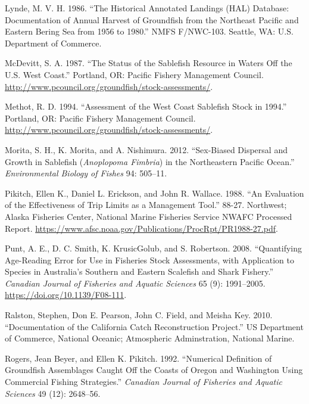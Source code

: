 \documentclass[
]{scrartcl}
\newlength{\cslhangindent}
\newenvironment{CSLReferences}[2] %
 {\begin{list}{}{%
  \setlength{\itemindent}{0pt}
  \setlength{\leftmargin}{0pt}
  \setlength{\parsep}{0pt}
  \ifodd #1
   \setlength{\leftmargin}{\cslhangindent}
   \setlength{\itemindent}{-1\cslhangindent}
  \fi
  \setlength{\itemsep}{#2\baselineskip}}}
 {\end{list}}
\begin{document}
\begin{CSLReferences}{1}{0}
Lynde, M. V. H. 1986. {``The Historical Annotated Landings ({HAL})
Database: Documentation of Annual Harvest of Groundfish from the
Northeast {P}acific and Eastern {B}ering {S}ea from 1956 to 1980.''}
NMFS F/NWC-103. Seattle, WA: {U}.{S}. Department of Commerce.

McDevitt, S. A. 1987. {``The Status of the Sablefish Resource in Waters
Off the {U}.{S}. {W}est {C}oast.''} Portland, OR: Pacific Fishery
Management Council.
\url{http://www.pcouncil.org/groundfish/stock-assessments/}.

Methot, R. D. 1994. {``Assessment of the West Coast Sablefish Stock in
1994.''} Portland, OR: Pacific Fishery Management Council.
\url{http://www.pcouncil.org/groundfish/stock-assessments/}.

Morita, S. H., K. Morita, and A. Nishimura. 2012. {``Sex-Biased
Dispersal and Growth in Sablefish (\emph{{A}noplopoma Fimbria}) in the
Northeastern {P}acific {O}cean.''} \emph{Environmental Biology of
Fishes} 94: 505--11.

Pikitch, Ellen K., Daniel L. Erickson, and John R. Wallace. 1988. {``An
Evaluation of the Effectiveness of Trip Limits as a Management Tool.''}
88-27. Northwest; Alaska Fisheries Center, National Marine Fisheries
Service NWAFC Processed Report.
\url{https://www.afsc.noaa.gov/Publications/ProcRpt/PR1988-27.pdf}.

Punt, A. E., D. C. Smith, K. KrusicGolub, and S. Robertson. 2008.
{``Quantifying Age-Reading Error for Use in Fisheries Stock Assessments,
with Application to Species in {A}ustralia's Southern and Eastern
Scalefish and Shark Fishery.''} \emph{Canadian Journal of Fisheries and
Aquatic Sciences} 65 (9): 1991--2005.
\url{https://doi.org/10.1139/F08-111}.

Ralston, Stephen, Don E. Pearson, John C. Field, and Meisha Key. 2010.
{``Documentation of the {California} Catch Reconstruction Project.''} US
Department of Commerce, National Oceanic; Atmospheric Adminstration,
National Marine.

Rogers, Jean Beyer, and Ellen K. Pikitch. 1992. {``Numerical Definition
of Groundfish Assemblages Caught Off the Coasts of {Oregon} and
{Washington} Using Commercial Fishing Strategies.''} \emph{Canadian
Journal of Fisheries and Aquatic Sciences} 49 (12): 2648--56.


\end{CSLReferences}
\end{document}
